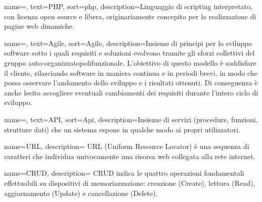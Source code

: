 {
	name=,
	text=PHP,
	sort=php,
	description={Linguaggio di scripting interpretato, con licenza open source e libera, originariamente concepito per la realizzazione di pagine web dinamiche.}
}

{
	name=,
	text=Agile,
	sort=Agile,
	description={Insieme di principi per lo sviluppo software sotto i quali requisiti e soluzioni
		evolvono tramite gli sforzi collettivi del gruppo auto-organizzatopolifunzionale. L’obiettivo di questo modello è soddisfare il cliente, rilasciando software in
		maniera continua e in periodi brevi, in modo che possa osservare l’andamento dello
		sviluppo e i risultati ottenuti. Di conseguenza è anche lecito accogliere eventuali
		cambiamenti dei requisiti durante l’intero ciclo di sviluppo.}
}

{
	name=,
	text=API,
	sort=Api,
	description={Insieme di servizi (procedure, funzioni, strutture dati) che un sistema espone in qualche modo ai propri utilizzatori.}
}

 {
	name=URL,
	description={
		URL (Uniform Resource Locator) è una sequenza di caratteri che individua univocamente una risorsa web 
		collegata alla rete internet.
	}
}

 {
	name=CRUD,
	description={
		CRUD indica le quattro operazioni fondamentali effettuabili su
		dispositivi di memoriazzazione: creazione (Create), lettura (Read), aggiornamento (Update) e cancellazione (Delete).
	}
}

